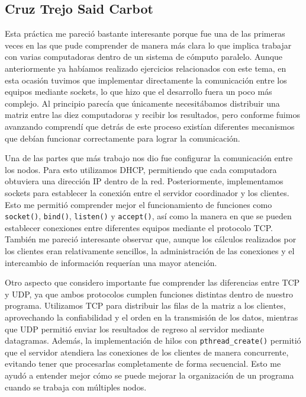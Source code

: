 \subsection{Cruz Trejo Said Carbot}
Esta práctica me pareció bastante interesante porque fue una de las primeras veces en las que pude comprender de manera más clara lo que implica trabajar con varias computadoras dentro de un sistema de cómputo paralelo. Aunque anteriormente ya habíamos realizado ejercicios relacionados con este tema, en esta ocasión tuvimos que implementar directamente la comunicación entre los equipos mediante sockets, lo que hizo que el desarrollo fuera un poco más complejo. Al principio parecía que únicamente necesitábamos distribuir una matriz entre las diez computadoras y recibir los resultados, pero conforme fuimos avanzando comprendí que detrás de este proceso existían diferentes mecanismos que debían funcionar correctamente para lograr la comunicación.

Una de las partes que más trabajo nos dio fue configurar la comunicación entre los nodos. Para esto utilizamos DHCP, permitiendo que cada computadora obtuviera una dirección IP dentro de la red. Posteriormente, implementamos sockets para establecer la conexión entre el servidor coordinador y los clientes. Esto me permitió comprender mejor el funcionamiento de funciones como \texttt{socket()}, \texttt{bind()}, \texttt{listen()} y \texttt{accept()}, así como la manera en que se pueden establecer conexiones entre diferentes equipos mediante el protocolo TCP. También me pareció interesante observar que, aunque los cálculos realizados por los clientes eran relativamente sencillos, la administración de las conexiones y el intercambio de información requerían una mayor atención.

Otro aspecto que considero importante fue comprender las diferencias entre TCP y UDP, ya que ambos protocolos cumplen funciones distintas dentro de nuestro programa. Utilizamos TCP para distribuir las filas de la matriz a los clientes, aprovechando la confiabilidad y el orden en la transmisión de los datos, mientras que UDP permitió enviar los resultados de regreso al servidor mediante datagramas. Además, la implementación de hilos con \texttt{pthread\_create()} permitió que el servidor atendiera las conexiones de los clientes de manera concurrente, evitando tener que procesarlas completamente de forma secuencial. Esto me ayudó a entender mejor cómo se puede mejorar la organización de un programa cuando se trabaja con múltiples nodos.

